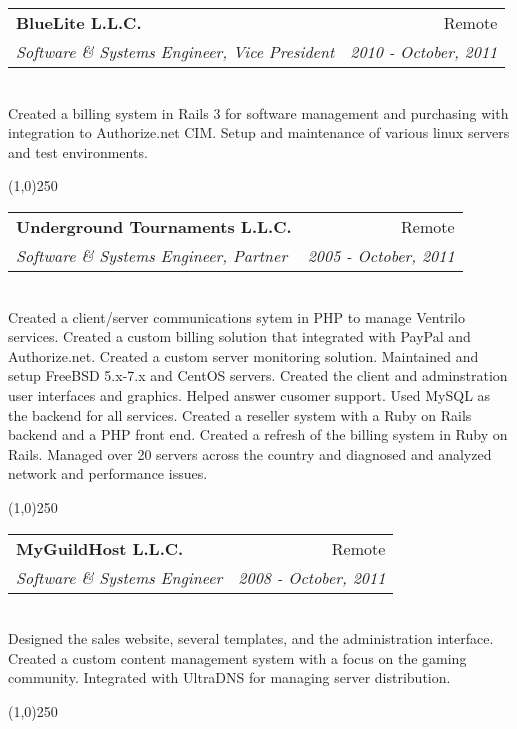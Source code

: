 \documentclass[a4paper,11pt,sans]{article}
\makeatletter
\newcommand{\ressubheading}[4]{
\begin{tabular*}{7.0in}{l@{\extracolsep{\fill}}r}
		\textbf{#1} & #2 \\
		\textit{#3} & \textit{#4} \\
\end{tabular*}\vspace{-6pt}}
\makeatother
\begin{document}
\ressubheading{BlueLite L.L.C.}{Remote}{Software \& Systems Engineer, Vice President}{2010 - October, 2011}

\hspace{5pt} \\

Created a billing system in Rails 3 for software management and purchasing with integration to Authorize.net CIM.
Setup and maintenance of various linux servers and test environments.


\begin{center}
  \line(1,0){250}
\end{center}

\ressubheading{Underground Tournaments L.L.C.}{Remote}{Software \& Systems Engineer, Partner}{2005 - October, 2011}

\hspace{5pt} \\

Created a client/server communications sytem in PHP to manage Ventrilo services.
Created a custom billing solution that integrated with PayPal and Authorize.net.
Created a custom server monitoring solution.
Maintained and setup FreeBSD 5.x-7.x and CentOS servers.
Created the client and adminstration user interfaces and graphics.
Helped answer cusomer support.
Used MySQL as the backend for all services.
Created a reseller system with a Ruby on Rails backend and a PHP front end.
Created a refresh of the billing system in Ruby on Rails.
Managed over 20 servers across the country and diagnosed and analyzed network and performance issues.

\begin{center}
  \line(1,0){250}
\end{center}


\ressubheading{MyGuildHost L.L.C.}{Remote}{Software \& Systems Engineer}{2008 - October, 2011}

\hspace{5pt} \\

Designed the sales website, several templates, and the administration interface.
Created a custom content management system with a focus on the gaming community.
Integrated with UltraDNS for managing server distribution.

\begin{center}
  \line(1,0){250}
\end{center}
\end{document}

